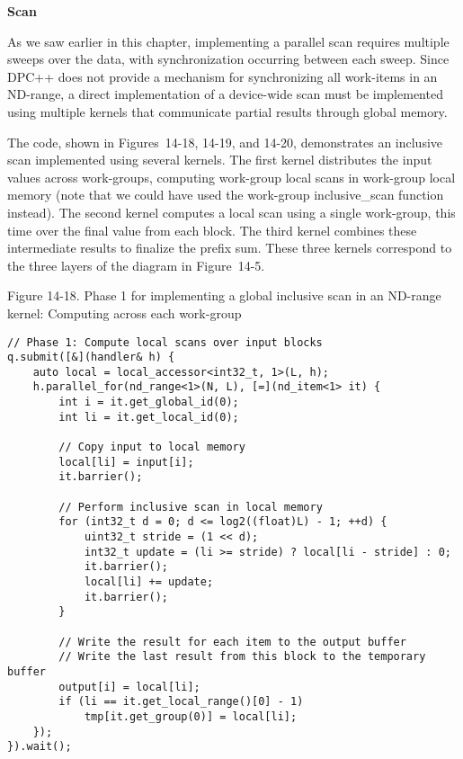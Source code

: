 \hspace*{\fill} \par %
\textbf{Scan}

As we saw earlier in this chapter, implementing a parallel scan requires multiple sweeps over the data, with synchronization occurring between each sweep. Since DPC++ does not provide a mechanism for synchronizing all work-items in an ND-range, a direct implementation of a device-wide scan must be implemented using multiple kernels that communicate partial results through global memory.\par

The code, shown in Figures 14-18, 14-19, and 14-20, demonstrates an inclusive scan implemented using several kernels. The first kernel distributes the input values across work-groups, computing work-group local scans in work-group local memory (note that we could have used the work-group inclusive\_scan function instead). The second kernel computes a local scan using a single work-group, this time over the final value from each block. The third kernel combines these intermediate results to finalize the prefix sum. These three kernels correspond to the three layers of the diagram in Figure 14-5.\par

\hspace*{\fill} \par %
Figure 14-18. Phase 1 for implementing a global inclusive scan in an ND-range kernel: Computing across each work-group
\begin{lstlisting}[caption={}]
// Phase 1: Compute local scans over input blocks
q.submit([&](handler& h) {
	auto local = local_accessor<int32_t, 1>(L, h);
	h.parallel_for(nd_range<1>(N, L), [=](nd_item<1> it) {
		int i = it.get_global_id(0);
		int li = it.get_local_id(0);
		
		// Copy input to local memory
		local[li] = input[i];
		it.barrier();
		
		// Perform inclusive scan in local memory
		for (int32_t d = 0; d <= log2((float)L) - 1; ++d) {
			uint32_t stride = (1 << d);
			int32_t update = (li >= stride) ? local[li - stride] : 0;
			it.barrier();
			local[li] += update;
			it.barrier();
		}
	
		// Write the result for each item to the output buffer
		// Write the last result from this block to the temporary buffer
		output[i] = local[li];
		if (li == it.get_local_range()[0] - 1)
			tmp[it.get_group(0)] = local[li];
	});
}).wait();
\end{lstlisting}

